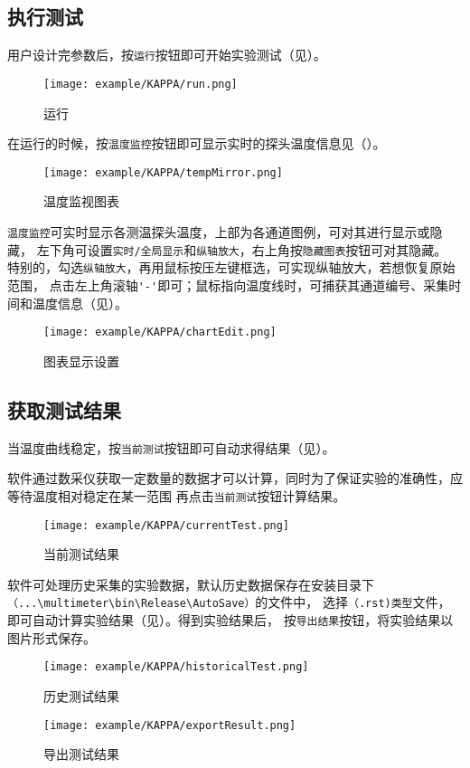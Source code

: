 \subsection{执行测试}
用户设计完参数后，按\lstinline{运行}按钮即可开始实验测试（见）。
\begin{figure}[htbp]
	\centering
	\texttt{[image: example/KAPPA/run.png]}
	\caption{ 运行 \label{fig:exmp_run}}
\end{figure}
在运行的时候，按\lstinline{温度监控}按钮即可显示实时的探头温度信息见（）。
\begin{figure}[htbp]
	\centering
	\texttt{[image: example/KAPPA/tempMirror.png]}
	\caption{ 温度监视图表 \label{fig:exmp_tempMirror}}
\end{figure}
\lstinline{温度监控}可实时显示各测温探头温度，上部为各通道图例，可对其进行显示或隐藏，
左下角可设置\lstinline{实时/全局显示}和\lstinline{纵轴放大}，右上角按\lstinline{隐藏图表}按钮可对其隐藏。
特别的，勾选\lstinline{纵轴放大}，再用鼠标按压左键框选，可实现纵轴放大，若想恢复原始范围，
点击左上角滚轴\lstinline{'-'}即可；鼠标指向温度线时，可捕获其通道编号、采集时间和温度信息（见）。\\
\begin{figure}[htbp]
	\centering
	\texttt{[image: example/KAPPA/chartEdit.png]}
	\caption{ 图表显示设置 \label{fig:exmp_chartEdit}}
\end{figure}

\subsection{获取测试结果}
	当温度曲线稳定，按\lstinline{当前测试}按钮即可自动求得结果（见）。
\begin{note}
	软件通过数采仪获取一定数量的数据才可以计算，同时为了保证实验的准确性，应等待温度相对稳定在某一范围
再点击\lstinline{当前测试}按钮计算结果。
\end{note}
\begin{figure}[htbp]
	\centering
	\texttt{[image: example/KAPPA/currentTest.png]}
	\caption{ 当前测试结果 \label{fig:exmp_currentTest}}
\end{figure}
软件可处理历史采集的实验数据，默认历史数据保存在安装目录下\lstinline{（...\multimeter\bin\Release\AutoSave）}的文件中，
选择\lstinline{（.rst)类型}文件，即可自动计算实验结果（见）。得到实验结果后，
按\lstinline{导出结果}按钮，将实验结果以图片形式保存。
\begin{figure}[htbp]
	\centering
	\texttt{[image: example/KAPPA/historicalTest.png]}
	\caption{ 历史测试结果 \label{fig:exmp_historicalTest}}
\end{figure}

\begin{figure}[htbp]
	\centering
	\texttt{[image: example/KAPPA/exportResult.png]}
	\caption{ 导出测试结果 \label{fig:exmp_exportResult}}
\end{figure}